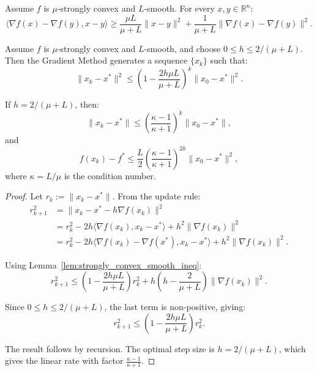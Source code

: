 \begin{lemma}
  \label{lem:strongly_convex_smooth_ineq}
  \leanok
  Assume $f$ is $\mu$-strongly convex and $L$-smooth. For every $x, y \in \mathbb{R}^n$:
  \[
    \langle\nabla f(x) - \nabla f(y), x - y\rangle \geq \frac{\mu L}{\mu + L}\|x - y\|^2 + \frac{1}{\mu + L}\|\nabla f(x) - \nabla f(y)\|^2.
  \]
\end{lemma}

\begin{theorem}
  \label{thm:strongly_convex_convergence}
  \leanok
  Assume $f$ is $\mu$-strongly convex and $L$-smooth, and choose $0 \leq h \leq 2/(\mu + L)$. Then the Gradient Method generates a sequence $\{x_k\}$ such that:
  \[
    \|x_k - x^*\|^2 \leq \left(1 - \frac{2h\mu L}{\mu + L}\right)^k \|x_0 - x^*\|^2.
  \]
  
  If $h = 2/(\mu + L)$, then:
  \[
    \|x_k - x^*\| \leq \left(\frac{\kappa - 1}{\kappa + 1}\right)^k \|x_0 - x^*\|,
  \]
  and
  \[
    f(x_k) - f^* \leq \frac{L}{2}\left(\frac{\kappa - 1}{\kappa + 1}\right)^{2k} \|x_0 - x^*\|^2,
  \]
  where $\kappa = L/\mu$ is the condition number.
\end{theorem}

\begin{proof}
  Let $r_k := \|x_k - x^*\|$. From the update rule:
  \begin{align}
    r_{k+1}^2 &= \|x_k - x^* - h\nabla f(x_k)\|^2 \\
    &= r_k^2 - 2h\langle\nabla f(x_k), x_k - x^*\rangle + h^2\|\nabla f(x_k)\|^2 \\
    &= r_k^2 - 2h\langle\nabla f(x_k) - \nabla f(x^*), x_k - x^*\rangle + h^2\|\nabla f(x_k)\|^2.
  \end{align}
  
  Using Lemma~\ref{lem:strongly_convex_smooth_ineq}:
  \[
    r_{k+1}^2 \leq \left(1 - \frac{2h\mu L}{\mu + L}\right)r_k^2 + h\left(h - \frac{2}{\mu + L}\right)\|\nabla f(x_k)\|^2.
  \]
  
  Since $0 \leq h \leq 2/(\mu + L)$, the last term is non-positive, giving:
  \[
    r_{k+1}^2 \leq \left(1 - \frac{2h\mu L}{\mu + L}\right)r_k^2.
  \]
  
  The result follows by recursion. The optimal step size is $h = 2/(\mu + L)$, which gives the linear rate with factor $\frac{\kappa - 1}{\kappa + 1}$.
\end{proof}
